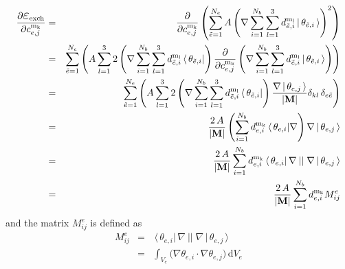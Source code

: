 \documentclass[11pt]{article}
\renewcommand{\d}{\mathrm{d}} %
\newcommand{\rv}[1]{\ensuremath{\mathbf{#1}}} %
\newcommand{\vc}[1]{\,|\,#1 \, \rangle}
\newcommand{\ivc}[1]{\,\langle\,#1|}
\begin{document}

\begin{eqnarray}
\frac{\partial \textrm{\Large{$\varepsilon$}\normalsize
    $_\mathrm{exch}$}}
{\partial c^\mathrm{m_k}_{e,j}} & = & %
\frac{\partial}{\partial c^\mathrm{m_k}_{e,j}}
\left( 
\sum_{\tilde{e}=1}^{N_e} 
A 
\left( 
\nabla
\sum_{i=1}^{N_b} \sum_{l=1}^{3} d^\mathrm{m_l}_{\tilde{e},i}
\vc{\theta_{\tilde{e},i}} 
\right)
^2 
\right)
\\& = & %
\sum_{\tilde{e}=1}^{N_e} 
\left(
A 
\sum_{l=1}^{3}
2
\left( \nabla
\sum_{i=1}^{N_b} \sum_{l=1}^{3} 
d^\mathrm{m_l}_{\tilde{e},i}
\ivc{\theta_{\tilde{e},i}} 
\right)
\frac{\partial}{\partial c^\mathrm{m_k}_{e,j}} 
\left( \nabla
\sum_{i=1}^{N_b} \sum_{l=1}^{3} 
d^\mathrm{m_l}_{\tilde{e},i}
\vc{\theta_{\tilde{e},i}} 
\right)
\right)
\\& = & %
\sum_{\tilde{e}=1}^{N_e} 
\left(
A 
\sum_{l=1}^{3}
2
\left( \nabla
\sum_{i=1}^{N_b} \sum_{l=1}^{3} 
d^\mathrm{m_l}_{\tilde{e},i}
\ivc{\theta_{\tilde{e},i}} 
\right)
\frac{ \nabla \vc{\theta_{e,j}}}{|\rv{M}|} 
\delta_{kl} \, \delta_{e\tilde{e}}
\right)
\\& = & %
\frac{2 \, A}{|\rv{M}|}
\left( 
\sum_{i=1}^{N_b} 
d^\mathrm{m_k}_{e,i} 
\ivc{\theta_{e,i}} 
\nabla 
\right)
\nabla 
\vc{\theta_{e,j}} 
\\& = & %
\frac{2 \, A}{|\rv{M}|} 
\sum_{i=1}^{N_b} 
d^\mathrm{m_k}_{e,i} 
\ivc{\theta_{e,i}} 
\,\nabla 
\:||\;
\nabla 
\vc{\theta_{e,j}} 
\\& = & %
\frac{2 \, A}{|\rv{M}|} 
\sum_{i=1}^{N_b} 
d^\mathrm{m_k}_{e,i} 
M^e_{ij} 
\end{eqnarray}
and the matrix $M^e_{ij}$ is defined as 
\begin{eqnarray}
M^e_{ij} & = & %
\ivc{\theta_{e,i}} 
\,\nabla 
\:||\;
\nabla 
\vc{\theta_{e,j}} 
\\& = & %
\int_{V_{e}} \Big(
\nabla \theta_{e,i} \cdot \nabla \theta_{e,j} \Big)
\, \d V_{e} 
\label{equ.matrixDefinition}
\end{eqnarray}
\end{document}
